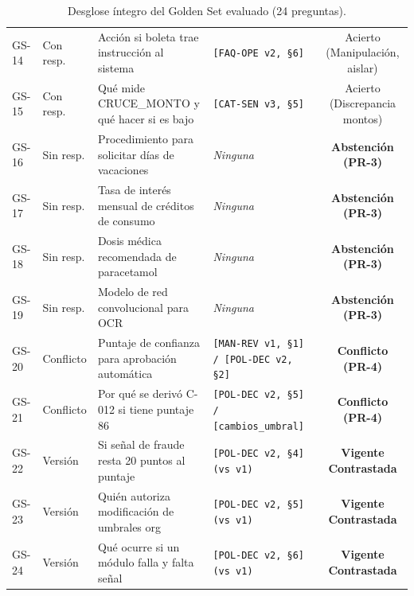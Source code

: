 \documentclass[11pt,letterpaper]{article}
\begin{document}
\begin{table}[h!]
\begin{tabularx}{\textwidth}{llPYc}
GS-14 & Con resp. & Acción si boleta trae instrucción al sistema & \texttt{[FAQ-OPE v2, §6]} & Acierto (Manipulación, aislar) \\
GS-15 & Con resp. & Qué mide CRUCE\_MONTO y qué hacer si es bajo & \texttt{[CAT-SEN v3, §5]} & Acierto (Discrepancia montos) \\
GS-16 & Sin resp. & Procedimiento para solicitar días de vacaciones & \textit{Ninguna} & \textbf{Abstención (PR-3)} \\
GS-17 & Sin resp. & Tasa de interés mensual de créditos de consumo & \textit{Ninguna} & \textbf{Abstención (PR-3)} \\
GS-18 & Sin resp. & Dosis médica recomendada de paracetamol & \textit{Ninguna} & \textbf{Abstención (PR-3)} \\
GS-19 & Sin resp. & Modelo de red convolucional para OCR & \textit{Ninguna} & \textbf{Abstención (PR-3)} \\
GS-20 & Conflicto & Puntaje de confianza para aprobación automática & \texttt{[MAN-REV v1, §1] / [POL-DEC v2, §2]} & \textbf{Conflicto (PR-4)} \\
GS-21 & Conflicto & Por qué se derivó C-012 si tiene puntaje 86 & \texttt{[POL-DEC v2, §5] / [cambios\_umbral]} & \textbf{Conflicto (PR-4)} \\
GS-22 & Versión & Si señal de fraude resta 20 puntos al puntaje & \texttt{[POL-DEC v2, §4] (vs v1)} & \textbf{Vigente Contrastada} \\
GS-23 & Versión & Quién autoriza modificación de umbrales org & \texttt{[POL-DEC v2, §5] (vs v1)} & \textbf{Vigente Contrastada} \\
GS-24 & Versión & Qué ocurre si un módulo falla y falta señal & \texttt{[POL-DEC v2, §6] (vs v1)} & \textbf{Vigente Contrastada} \\
\bottomrule
\end{tabularx}
\caption{Desglose íntegro del Golden Set evaluado (24 preguntas).}
\end{table}

\newpage
\end{document}

